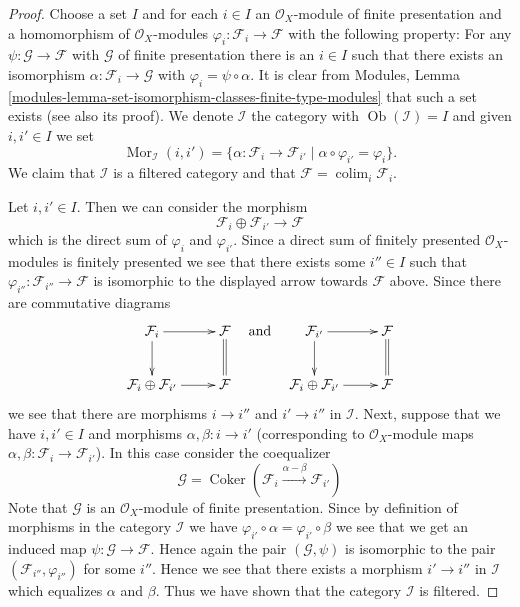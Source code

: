 \documentclass{stacks-project}
\theoremstyle{plain}
\theoremstyle{definition}
\theoremstyle{remark}
\numberwithin{equation}{subsection}
\def\colim{\mathop{\mathrm{colim}}\nolimits}
\def\Mor{\mathop{\mathrm{Mor}}\nolimits}
\def\Ob{\mathop{\mathrm{Ob}}\nolimits}
\def\Coker{\mathop{\mathrm{Coker}}}
\begin{document}
\begin{proof}
Choose a set $I$ and for each $i \in I$ an $\mathcal{O}_X$-module
of finite presentation and a homomorphism of $\mathcal{O}_X$-modules
$\varphi_i : \mathcal{F}_i \to \mathcal{F}$ with the following
property: For any $\psi : \mathcal{G} \to \mathcal{F}$ with $\mathcal{G}$
of finite presentation there is an $i \in I$ such that there exists
an isomorphism $\alpha : \mathcal{F}_i \to \mathcal{G}$ with
$\varphi_i = \psi \circ \alpha$. It is clear from
Modules, Lemma \ref{modules-lemma-set-isomorphism-classes-finite-type-modules}
that such a set exists (see also its proof).
We denote $\mathcal{I}$ the category
with $\Ob(\mathcal{I}) = I$ and given $i, i' \in I$
we set
$$
\Mor_\mathcal{I}(i, i') =
\{\alpha : \mathcal{F}_i \to \mathcal{F}_{i'} \mid
\alpha \circ \varphi_{i'} = \varphi_i
\}.
$$
We claim that $\mathcal{I}$ is a filtered category and that
$\mathcal{F} = \colim_i \mathcal{F}_i$.

\medskip\noindent
Let $i, i' \in I$. Then we can consider the morphism
$$
\mathcal{F}_i \oplus \mathcal{F}_{i'} \longrightarrow \mathcal{F}
$$
which is the direct sum of $\varphi_i$ and $\varphi_{i'}$.
Since a direct sum of finitely presented $\mathcal{O}_X$-modules
is finitely presented we see that there exists some $i'' \in I$
such that $\varphi_{i''} : \mathcal{F}_{i''} \to \mathcal{F}$
is isomorphic to the displayed arrow towards $\mathcal{F}$ above.
Since there are commutative diagrams
$$
\xymatrix{
\mathcal{F}_i \ar[r] \ar[d] & \mathcal{F} \ar@{=}[d] \\
\mathcal{F}_i \oplus \mathcal{F}_{i'} \ar[r] & \mathcal{F}
}
\quad
\text{and}
\quad
\xymatrix{
\mathcal{F}_{i'} \ar[r] \ar[d] & \mathcal{F} \ar@{=}[d] \\
\mathcal{F}_i \oplus \mathcal{F}_{i'} \ar[r] & \mathcal{F}
}
$$
we see that there are morphisms $i \to i''$ and $i' \to i''$
in $\mathcal{I}$. Next, suppose that we have $i, i' \in I$ and
morphisms $\alpha, \beta : i \to i'$ (corresponding to $\mathcal{O}_X$-module
maps $\alpha, \beta : \mathcal{F}_i \to \mathcal{F}_{i'}$).
In this case consider the coequalizer
$$
\mathcal{G} =
\Coker(
\mathcal{F}_i \xrightarrow{\alpha - \beta} \mathcal{F}_{i'}
)
$$
Note that $\mathcal{G}$ is an $\mathcal{O}_X$-module of finite presentation.
Since by definition of morphisms in the category $\mathcal{I}$
we have $\varphi_{i'} \circ \alpha = \varphi_{i'} \circ \beta$
we see that we get an induced map $\psi : \mathcal{G} \to \mathcal{F}$.
Hence again the pair $(\mathcal{G}, \psi)$ is isomorphic to
the pair $(\mathcal{F}_{i''}, \varphi_{i''})$ for some $i''$.
Hence we see that there exists a morphism $i' \to i''$ in
$\mathcal{I}$ which equalizes $\alpha$ and $\beta$. Thus we have
shown that the category $\mathcal{I}$ is filtered.


\end{proof}
\end{document}
